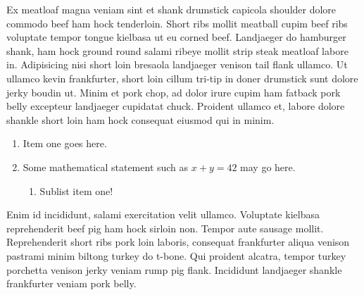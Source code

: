 \documentclass{coursework}
\begin{document}
  Ex meatloaf magna veniam sint et shank drumstick capicola shoulder dolore commodo beef ham hock tenderloin. Short ribs mollit meatball cupim beef ribs voluptate tempor tongue kielbasa ut eu corned beef. Landjaeger do hamburger shank, ham hock ground round salami ribeye mollit strip steak meatloaf labore in. Adipisicing nisi short loin bresaola landjaeger venison tail flank ullamco. Ut ullamco kevin frankfurter, short loin cillum tri-tip in doner drumstick sunt dolore jerky boudin ut. Minim et pork chop, ad dolor irure cupim ham fatback pork belly excepteur landjaeger cupidatat chuck. Proident ullamco et, labore dolore shankle short loin ham hock consequat eiusmod qui in minim.

  \begin{enumerate}
    \item Item one goes here.
    \item Some mathematical statement such as $x + y = 42$ may go here.
    \begin{enumerate}
      \item Sublist item one!
    \end{enumerate}
  \end{enumerate}

  Enim id incididunt, salami exercitation velit ullamco. Voluptate kielbasa reprehenderit beef pig ham hock sirloin non. Tempor aute sausage mollit. Reprehenderit short ribs pork loin laboris, consequat frankfurter aliqua venison pastrami minim biltong turkey do t-bone. Qui proident alcatra, tempor turkey porchetta venison jerky veniam rump pig flank. Incididunt landjaeger shankle frankfurter veniam pork belly.
\end{document}
